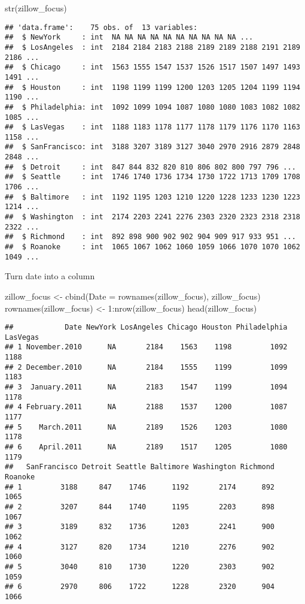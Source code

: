 \documentclass[
]{article}
\newenvironment{Shaded}{\begin{snugshade}}{\end{snugshade}}
\newcommand{\AttributeTok}[1]{\textcolor[rgb]{0.77,0.63,0.00}{#1}}
\newcommand{\DecValTok}[1]{\textcolor[rgb]{0.00,0.00,0.81}{#1}}
\newcommand{\FunctionTok}[1]{\textcolor[rgb]{0.00,0.00,0.00}{#1}}
\newcommand{\NormalTok}[1]{#1}
\newcommand{\OtherTok}[1]{\textcolor[rgb]{0.56,0.35,0.01}{#1}}
\newcommand{\SpecialCharTok}[1]{\textcolor[rgb]{0.00,0.00,0.00}{#1}}
\begin{document}
\begin{Shaded}
\begin{Highlighting}[]
\FunctionTok{str}\NormalTok{(zillow\_focus)}
\end{Highlighting}
\end{Shaded}

\begin{verbatim}
## 'data.frame':    75 obs. of  13 variables:
##  $ NewYork     : int  NA NA NA NA NA NA NA NA NA NA ...
##  $ LosAngeles  : int  2184 2184 2183 2188 2189 2189 2188 2191 2189 2186 ...
##  $ Chicago     : int  1563 1555 1547 1537 1526 1517 1507 1497 1493 1491 ...
##  $ Houston     : int  1198 1199 1199 1200 1203 1205 1204 1199 1194 1190 ...
##  $ Philadelphia: int  1092 1099 1094 1087 1080 1080 1083 1082 1082 1085 ...
##  $ LasVegas    : int  1188 1183 1178 1177 1178 1179 1176 1170 1163 1158 ...
##  $ SanFrancisco: int  3188 3207 3189 3127 3040 2970 2916 2879 2848 2848 ...
##  $ Detroit     : int  847 844 832 820 810 806 802 800 797 796 ...
##  $ Seattle     : int  1746 1740 1736 1734 1730 1722 1713 1709 1708 1706 ...
##  $ Baltimore   : int  1192 1195 1203 1210 1220 1228 1233 1230 1223 1214 ...
##  $ Washington  : int  2174 2203 2241 2276 2303 2320 2323 2318 2318 2322 ...
##  $ Richmond    : int  892 898 900 902 902 904 909 917 933 951 ...
##  $ Roanoke     : int  1065 1067 1062 1060 1059 1066 1070 1070 1062 1049 ...
\end{verbatim}

Turn date into a column

\begin{Shaded}
\begin{Highlighting}[]
\NormalTok{zillow\_focus }\OtherTok{\textless{}{-}} \FunctionTok{cbind}\NormalTok{(}\AttributeTok{Date =} \FunctionTok{rownames}\NormalTok{(zillow\_focus), zillow\_focus)}
\FunctionTok{rownames}\NormalTok{(zillow\_focus) }\OtherTok{\textless{}{-}} \DecValTok{1}\SpecialCharTok{:}\FunctionTok{nrow}\NormalTok{(zillow\_focus)}
\FunctionTok{head}\NormalTok{(zillow\_focus)}
\end{Highlighting}
\end{Shaded}

\begin{verbatim}
##            Date NewYork LosAngeles Chicago Houston Philadelphia LasVegas
## 1 November.2010      NA       2184    1563    1198         1092     1188
## 2 December.2010      NA       2184    1555    1199         1099     1183
## 3  January.2011      NA       2183    1547    1199         1094     1178
## 4 February.2011      NA       2188    1537    1200         1087     1177
## 5    March.2011      NA       2189    1526    1203         1080     1178
## 6    April.2011      NA       2189    1517    1205         1080     1179
##   SanFrancisco Detroit Seattle Baltimore Washington Richmond Roanoke
## 1         3188     847    1746      1192       2174      892    1065
## 2         3207     844    1740      1195       2203      898    1067
## 3         3189     832    1736      1203       2241      900    1062
## 4         3127     820    1734      1210       2276      902    1060
## 5         3040     810    1730      1220       2303      902    1059
## 6         2970     806    1722      1228       2320      904    1066
\end{verbatim}
\end{document}
